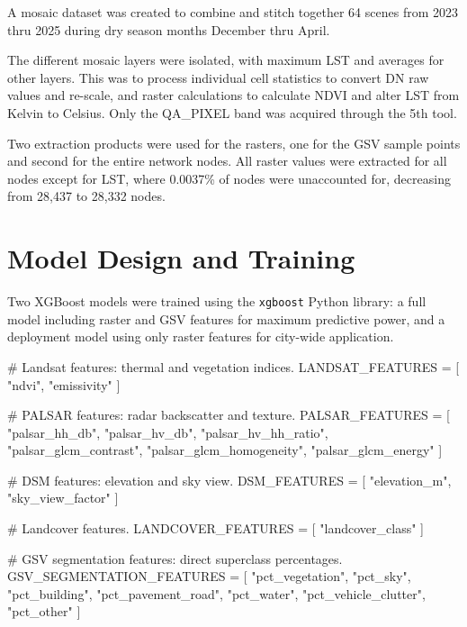 \documentclass[
]{report}
\newenvironment{Shaded}{\begin{snugshade}}{\end{snugshade}}
\newcommand{\CommentTok}[1]{\textcolor[rgb]{0.37,0.37,0.37}{#1}}
\newcommand{\NormalTok}[1]{\textcolor[rgb]{0.00,0.23,0.31}{#1}}
\newcommand{\OperatorTok}[1]{\textcolor[rgb]{0.37,0.37,0.37}{#1}}
\newcommand{\StringTok}[1]{\textcolor[rgb]{0.13,0.47,0.30}{#1}}
\begin{document}
A mosaic dataset was created to combine and stitch together 64 scenes
from 2023 thru 2025 during dry season months December thru April.

The different mosaic layers were isolated, with maximum LST and averages
for other layers. This was to process individual cell statistics to
convert DN raw values and re-scale, and raster calculations to calculate
NDVI and alter LST from Kelvin to Celsius. Only the QA\_PIXEL band was
acquired through the 5th tool.

Two extraction products were used for the rasters, one for the GSV
sample points and second for the entire network nodes. All raster values
were extracted for all nodes except for LST, where 0.0037\% of nodes
were unaccounted for, decreasing from 28,437 to 28,332 nodes.

\section{Model Design and Training}\label{model-design-and-training}

Two XGBoost models were trained using the \texttt{xgboost} Python
library: a full model including raster and GSV features for maximum
predictive power, and a deployment model using only raster features for
city-wide application.

\begin{Shaded}
\begin{Highlighting}[]
\CommentTok{\# Landsat features: thermal and vegetation indices.}
\NormalTok{LANDSAT\_FEATURES }\OperatorTok{=}\NormalTok{ [}
    \StringTok{"ndvi"}\NormalTok{,}
    \StringTok{"emissivity"}
\NormalTok{]}

\CommentTok{\# PALSAR features: radar backscatter and texture.}
\NormalTok{PALSAR\_FEATURES }\OperatorTok{=}\NormalTok{ [}
    \StringTok{"palsar\_hh\_db"}\NormalTok{,}
    \StringTok{"palsar\_hv\_db"}\NormalTok{,}
    \StringTok{"palsar\_hv\_hh\_ratio"}\NormalTok{,}
    \StringTok{"palsar\_glcm\_contrast"}\NormalTok{,}
    \StringTok{"palsar\_glcm\_homogeneity"}\NormalTok{,}
    \StringTok{"palsar\_glcm\_energy"}
\NormalTok{]}

\CommentTok{\# DSM features: elevation and sky view.}
\NormalTok{DSM\_FEATURES }\OperatorTok{=}\NormalTok{ [}
    \StringTok{"elevation\_m"}\NormalTok{,}
    \StringTok{"sky\_view\_factor"}
\NormalTok{]}

\CommentTok{\# Landcover features.}
\NormalTok{LANDCOVER\_FEATURES }\OperatorTok{=}\NormalTok{ [}
    \StringTok{"landcover\_class"}
\NormalTok{]}

\CommentTok{\# GSV segmentation features: direct superclass percentages.}
\NormalTok{GSV\_SEGMENTATION\_FEATURES }\OperatorTok{=}\NormalTok{ [}
    \StringTok{"pct\_vegetation"}\NormalTok{,}
    \StringTok{"pct\_sky"}\NormalTok{,}
    \StringTok{"pct\_building"}\NormalTok{,}
    \StringTok{"pct\_pavement\_road"}\NormalTok{,}
    \StringTok{"pct\_water"}\NormalTok{,}
    \StringTok{"pct\_vehicle\_clutter"}\NormalTok{,}
    \StringTok{"pct\_other"}
\NormalTok{]}
\end{Highlighting}
\end{Shaded}
\end{document}

